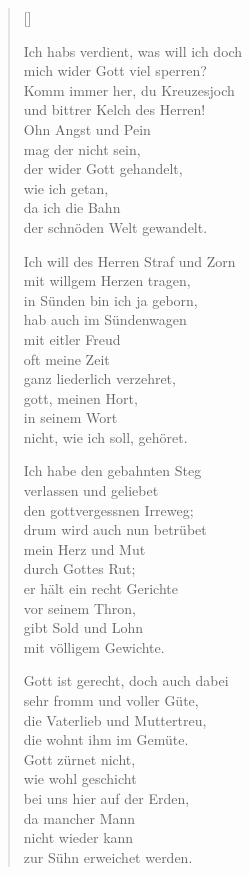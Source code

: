 \begin{multicols}{2}
\settowidth{\versewidth}{Ich habs verdient, was will ich doch}
\begin{verse}[\versewidth]

 Ich habs verdient, was will ich doch\\
mich wider Gott viel sperren?\\
Komm immer her, du Kreuzesjoch\\
und bittrer Kelch des Herren!\\
Ohn Angst und Pein\\
mag der nicht sein,\\
der wider Gott gehandelt,\\
wie ich getan,\\
da ich die Bahn\\
der schnöden Welt gewandelt.

 Ich will des Herren Straf und Zorn\\
mit willgem Herzen tragen,\\
in Sünden bin ich ja geborn,\\
hab auch im Sündenwagen\\
mit eitler Freud\\
oft meine Zeit\\
ganz liederlich verzehret,\\
gott, meinen Hort,\\
in seinem Wort\\
nicht, wie ich soll, gehöret.

 Ich habe den gebahnten Steg\\
verlassen und geliebet\\
den gottvergessnen Irreweg;\\
drum wird auch nun betrübet\\
mein Herz und Mut\\
durch Gottes Rut;\\
er hält ein recht Gerichte\\
vor seinem Thron,\\
gibt Sold und Lohn\\
mit völligem Gewichte.

 Gott ist gerecht, doch auch dabei\\
sehr fromm und voller Güte,\\
die Vaterlieb und Muttertreu,\\
die wohnt ihm im Gemüte.\\
Gott zürnet nicht,\\
wie wohl geschicht\\
bei uns hier auf der Erden,\\
da mancher Mann\\
nicht wieder kann\\
zur Sühn erweichet werden.


\end{verse}
\end{multicols}
